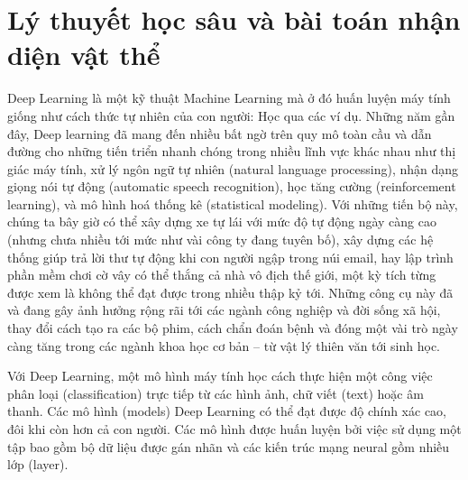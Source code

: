 \documentclass[a4paper, 12pt]{report}
\begin{document}
%
%




\chapter{Lý thuyết học sâu và bài toán nhận diện vật thể}
Deep Learning là một kỹ thuật Machine Learning mà ở đó huấn luyện máy tính giống như cách thức tự nhiên của con người: Học qua các ví dụ. Những năm gần đây, Deep learning đã mang đến nhiều bất ngờ trên quy mô toàn cầu và dẫn đường cho những tiến triển nhanh chóng trong nhiều lĩnh vực khác nhau như thị giác máy tính, xử lý ngôn ngữ tự nhiên (natural language processing), nhận dạng giọng nói tự động (automatic speech recognition), học tăng cường (reinforcement learning), và mô hình hoá thống kê (statistical modeling). Với những tiến bộ này, chúng ta bây giờ có thể xây dựng xe tự lái với mức độ tự động ngày càng cao (nhưng chưa nhiều tới mức như vài công ty đang tuyên bố), xây dựng các hệ thống giúp trả lời thư tự động khi con người ngập trong núi email, hay lập trình phần mềm chơi cờ vây có thể thắng cả nhà vô địch thế giới, một kỳ tích từng được xem là không thể đạt được trong nhiều thập kỷ tới. Những công cụ này đã và đang gây ảnh hưởng rộng rãi tới các ngành công nghiệp và đời sống xã hội, thay đổi cách tạo ra các bộ phim, cách chẩn đoán bệnh và đóng một vài trò ngày càng tăng trong các ngành khoa học cơ bản – từ vật lý thiên văn tới sinh học.\par
Với Deep Learning, một mô hình máy tính học cách thực hiện một công việc phân loại (classification) trực tiếp từ các hình ảnh, chữ viết (text) hoặc âm thanh. Các mô hình (models) Deep Learning có thể đạt được độ chính xác cao, đôi khi còn hơn cả con người. Các mô hình được huấn luyện bởi việc sử dụng một tập bao gồm bộ dữ liệu được gán nhãn và các kiến trúc mạng neural gồm nhiều lớp (layer). \par
\end{document}

